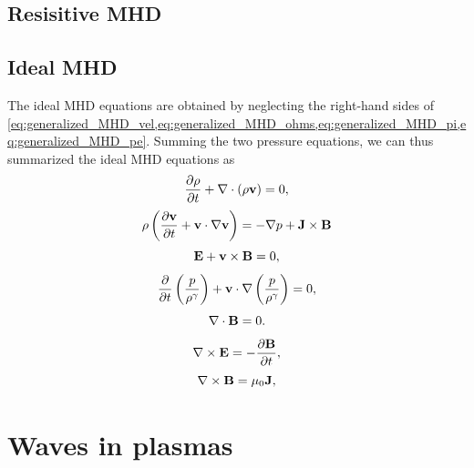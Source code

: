 \documentclass[oneside,a4paper,11pt]{report}
\begin{document}
\section{Resisitive MHD}

\section{Ideal MHD}
The ideal MHD equations are obtained by neglecting the right-hand sides of \cref{eq:generalized_MHD_vel,eq:generalized_MHD_ohms,eq:generalized_MHD_pi,eq:generalized_MHD_pe}. Summing the two pressure equations, we can thus summarized the ideal MHD equations as
\begin{equation}
    \frac{\partial \rho}{\partial t} + \nabla \cdot (\rho \mathbf{v}) = 0,
\end{equation}
\begin{equation}
    \rho \left (\frac{\partial \mathbf{v}}{\partial t} + \mathbf{v} \cdot \nabla \mathbf{v} \right) = - \nabla p  + \mathbf{J} \times \mathbf{B}
\end{equation}
\begin{equation}
    \mathbf{E} + \mathbf{v} \times \mathbf{B} = 0,
\end{equation}
\begin{equation}
    \frac{\partial}{\partial t} \left ( \frac{p}{\rho^\gamma} \right) + \mathbf{v} \cdot \nabla \left (\frac{p}{\rho^\gamma} \right) = 0,
\end{equation}
\begin{equation}
\nabla \cdot \mathbf{B} = 0.
\end{equation}
\begin{equation}
\nabla \times \mathbf{E} = -\frac{ \partial \mathbf{B}}{\partial t},
\end{equation}
\begin{equation}
\nabla \times \mathbf{B} = \mu_0 \mathbf{J} ,
\end{equation}

\chapter{Waves in plasmas}

\end{document}
